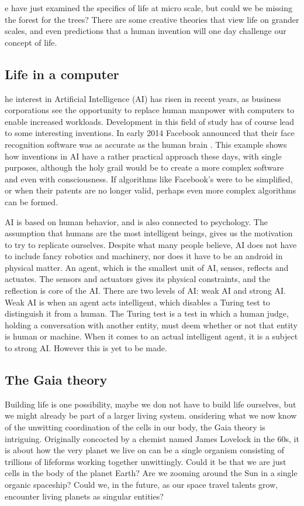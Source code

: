 e have just examined the specifics of life at micro scale, but could we be missing the forest for the trees?
There are some creative theories that view life on grander scales, and even predictions that a human invention will one day challenge our concept of life.

\subsection{Life in a computer}
he interest in Artificial Intelligence (AI) has risen in recent years, as business corporations see the opportunity to replace human manpower with computers to enable increased workloads.
Development in this field of study has of course lead to some interesting inventions.
In early 2014 Facebook announced that their face recognition software was as accurate as the human brain \cite{facebook}.
This example shows how inventions in AI have a rather practical approach these days, with single purposes, although the holy grail would be to create a more complex software and even with consciousness.
If algorithms like Facebook's were to be simplified, or when their patents are no longer valid, perhaps even more complex algorithms can be formed.

AI is based on human behavior, and is also connected to psychology.
The assumption that humans are the most intelligent beings, gives us the motivation to try to replicate ourselves.
Despite what many people believe, AI does not have to include fancy robotics and machinery, nor does it have to be an android in physical matter.
An agent, which is the smallest unit of AI, senses, reflects and actuates.
The sensors and actuators gives its physical constraints, and the reflection is core of the AI.
There are two levels of AI: weak AI and strong AI.
Weak AI is when an agent acts intelligent, which disables a Turing test to distinguish it from a human.
The Turing test is a test in which a human judge, holding a conversation with another entity, must deem whether or not that entity is human or machine. 
When it comes to an actual intelligent agent, it is a subject to strong AI.
However this is yet to be made.



\subsection{The Gaia theory}
Building life is one possibility, maybe we don not have to build life ourselves, but we might already be part of a larger living system.
onsidering what we now know of the unwitting coordination of the cells in our body, the Gaia theory is intriguing.
Originally concocted by a chemist named James Lovelock\cite{Lovelock} in the 60s, it is about how the very planet we live on can be a single organism consisting of trillions of lifeforms working together unwittingly.
Could it be that we are just cells in the body of the planet Earth?
Are we zooming around the Sun in a single organic spaceship?
Could we, in the future, as our space travel talents grow, encounter living planets as singular entities?